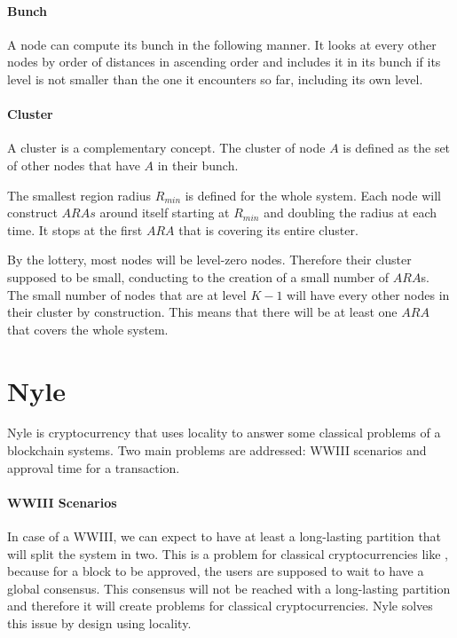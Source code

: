 \documentclass[a4paper,11pt,oneside]{report}
\begin{document}
\paragraph{Bunch} A node can compute its bunch in the following manner. It
looks at every other nodes by order of distances in ascending order and
includes it in its bunch if its level is not smaller than the one it encounters
so far, including its own level. 

\paragraph{Cluster} A cluster is a complementary concept. The cluster of node
$A$ is defined as the set of other nodes that have $A$ in their bunch. 

The smallest region radius $R_{min}$ is defined for the whole system. Each node
will construct $ARAs$ around itself starting at $R_{min}$ and doubling the
radius at each time. It stops at the first $ARA$ that is covering its entire
cluster. 

By the lottery, most nodes will be level-zero nodes. Therefore their cluster
supposed to be small, conducting to the creation of a small number of $ARA$s.
The small number of nodes that are at level $K-1$ will have every other nodes
in their cluster by construction. This means that there will be at least one
$ARA$ that covers the whole system. 

\section{Nyle}

Nyle is cryptocurrency that uses locality to answer some classical problems of
a blockchain systems. Two main problems are addressed: WWIII scenarios and
approval time for a transaction.
 
\paragraph{WWIII Scenarios} \label{WWIII} In case of a WWIII, we can expect to have
at least a long-lasting partition that will split the system in two. This is a
problem for classical cryptocurrencies like \cite{Nakamoto2009}, because for a
block to be approved, the users are supposed to wait to have a global
consensus. This consensus will not be reached with a long-lasting partition and
therefore it will create problems for classical cryptocurrencies. Nyle solves
this issue by design using locality.
\end{document}
